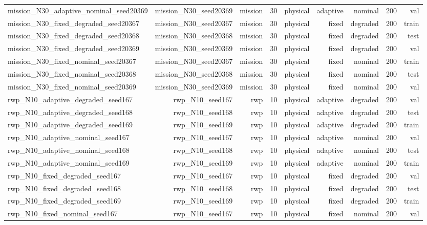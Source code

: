 \begin{tabular}{lrrrrrrrr}
mission\_N30\_adaptive\_nominal\_seed20369 & mission\_N30\_seed20369 & mission & 30 & physical & adaptive & nominal & 200 & val \\
mission\_N30\_fixed\_degraded\_seed20367 & mission\_N30\_seed20367 & mission & 30 & physical & fixed & degraded & 200 & train \\
mission\_N30\_fixed\_degraded\_seed20368 & mission\_N30\_seed20368 & mission & 30 & physical & fixed & degraded & 200 & test \\
mission\_N30\_fixed\_degraded\_seed20369 & mission\_N30\_seed20369 & mission & 30 & physical & fixed & degraded & 200 & val \\
mission\_N30\_fixed\_nominal\_seed20367 & mission\_N30\_seed20367 & mission & 30 & physical & fixed & nominal & 200 & train \\
mission\_N30\_fixed\_nominal\_seed20368 & mission\_N30\_seed20368 & mission & 30 & physical & fixed & nominal & 200 & test \\
mission\_N30\_fixed\_nominal\_seed20369 & mission\_N30\_seed20369 & mission & 30 & physical & fixed & nominal & 200 & val \\
rwp\_N10\_adaptive\_degraded\_seed167 & rwp\_N10\_seed167 & rwp & 10 & physical & adaptive & degraded & 200 & val \\
rwp\_N10\_adaptive\_degraded\_seed168 & rwp\_N10\_seed168 & rwp & 10 & physical & adaptive & degraded & 200 & test \\
rwp\_N10\_adaptive\_degraded\_seed169 & rwp\_N10\_seed169 & rwp & 10 & physical & adaptive & degraded & 200 & train \\
rwp\_N10\_adaptive\_nominal\_seed167 & rwp\_N10\_seed167 & rwp & 10 & physical & adaptive & nominal & 200 & val \\
rwp\_N10\_adaptive\_nominal\_seed168 & rwp\_N10\_seed168 & rwp & 10 & physical & adaptive & nominal & 200 & test \\
rwp\_N10\_adaptive\_nominal\_seed169 & rwp\_N10\_seed169 & rwp & 10 & physical & adaptive & nominal & 200 & train \\
rwp\_N10\_fixed\_degraded\_seed167 & rwp\_N10\_seed167 & rwp & 10 & physical & fixed & degraded & 200 & val \\
rwp\_N10\_fixed\_degraded\_seed168 & rwp\_N10\_seed168 & rwp & 10 & physical & fixed & degraded & 200 & test \\
rwp\_N10\_fixed\_degraded\_seed169 & rwp\_N10\_seed169 & rwp & 10 & physical & fixed & degraded & 200 & train \\
rwp\_N10\_fixed\_nominal\_seed167 & rwp\_N10\_seed167 & rwp & 10 & physical & fixed & nominal & 200 & val \\

\end{tabular}
